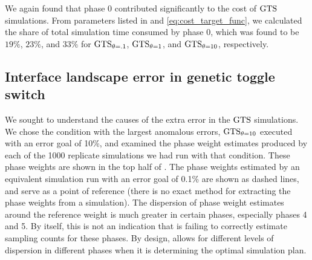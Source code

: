 We again found that phase 0 contributed significantly to the cost of $\text{GTS}$ simulations. From parameters listed in  and \eqref{eq:cost_target_func}, we calculated the share of total simulation time consumed by phase 0, which was found to be $19\%$, $23\%$, and  $33\%$ for $\text{GTS}_{\theta=.1}$, $\text{GTS}_{\theta=1}$, and $\text{GTS}_{\theta=10}$, respectively.

\subsection{Interface landscape error in genetic toggle switch}
\label{sec:landscape_error}

We sought to understand the causes of the extra error in the $\text{GTS}$ simulations. We chose the condition with the largest anomalous errors, $\text{GTS}_{\theta=10}$ executed with an error goal of 10\%, and examined the phase weight estimates produced by each of the 1000 replicate simulations we had run with that condition. These phase weights are shown in the top half of . The phase weights estimated by an equivalent  simulation run with an error goal of 0.1\% are shown as dashed lines, and serve as a point of reference (there is no exact method for extracting the phase weights from a  simulation). The dispersion of phase weight estimates around the reference weight is much greater in certain phases, especially phases 4 and 5. By itself, this is not an indication that  is failing to correctly estimate sampling counts for these phases. By design,  allows for different levels of dispersion in different phases when it is determining the optimal simulation plan.

